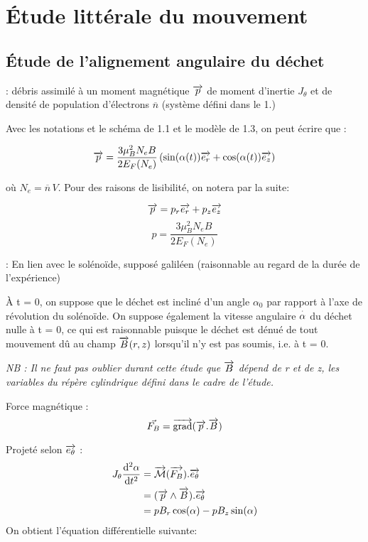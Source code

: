 \documentclass{report}
\begin{document}
\section{Étude littérale du mouvement}
\subsection{Étude de l'alignement angulaire du déchet}

: {débris assimilé à un moment magnétique $\overrightarrow{p}$ de moment d'inertie $J_\theta$ et de densité de population d'électrons $\overline{n}$ (système défini dans le 1.)}

Avec les notations et le schéma de 1.1 et le modèle de 1.3, on peut écrire que :

$$\overrightarrow{p} = \frac{3\mu_B^2 N_e B}{2 E_F(N_e)} \left(\sin(\alpha(t)) \overrightarrow{e_r} + \cos(\alpha(t)) \overrightarrow{e_z}\right) $$

où $N_e = \overline{n}\, V$. Pour des raisons de lisibilité, on notera par la suite:

$$\overrightarrow{p} = p_r \overrightarrow{e_r} + p_z \overrightarrow{e_z}$$
$$p = \frac{3\mu_B^2 N_e B}{2 E_F(N_e)}$$

: En lien avec le solénoïde, supposé galiléen (raisonnable au regard de la durée de l'expérience)


À t = 0, on suppose que le déchet est incliné d'un angle $\alpha_0$ par rapport à l'axe de révolution du solénoïde. On suppose également la vitesse angulaire $\overset{\cdot}{\alpha}$ du déchet nulle à t = 0, ce qui est raisonnable puisque le déchet est dénué de tout mouvement dû au champ $\overrightarrow{B}(r,z)$ lorsqu'il n'y est pas soumis, i.e. à t = 0.


\emph{NB : Il ne faut pas oublier durant cette étude que $\overrightarrow{B}$ dépend de r et de z, les variables du répère cylindrique défini dans le cadre de l'étude.}

Force magnétique :
$$\vec{F_B} = \overrightarrow{\text{grad}}(\overrightarrow{p}.\overrightarrow{B})$$


Projeté selon $\overrightarrow{e_\theta}$ :
\begin{align*}
J_\theta \frac{\mathrm{d^2}\alpha}{\mathrm{d}t^2} &= \overrightarrow{\mathcal{M}}(\overrightarrow{F_B}) . \overrightarrow{e_\theta} \\
&= (\overrightarrow{p} \wedge \overrightarrow{B}).\overrightarrow{e_\theta}\\
&= pB_r \cos(\alpha) - pB_z\sin(\alpha)
\end{align*}
\newpage
On obtient l'équation différentielle suivante:
\end{document}
